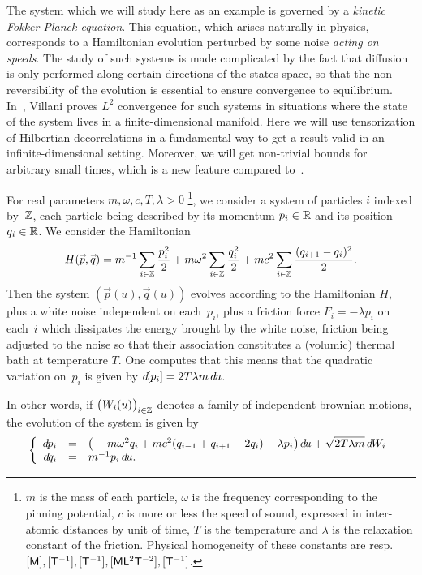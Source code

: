 The system which we will study here as an example
is governed by a \emph{kinetic Fokker-Planck equation}.
This equation, which arises naturally in phy\-sics, corresponds to a Hamiltonian evolution
perturbed by some noise \emph{acting on speeds}.
The study of such systems is made complicated by the fact that diffusion is only performed
along certain directions of the states space,
so that the non-reversibility of the evolution is essential to ensure convergence to equilibrium.
In~\cite{hypocoercivity}, Villani proves $L^2$ convergence for such systems
in situations where the state of the system lives in a finite-dimensional manifold.
Here we will use tensorization of Hilbertian decorrelations in a fundamental way
to get a result valid in an infinite-dimensional setting.
Moreover, we will get non-trivial bounds for arbitrary small times,
which is a new feature compared to~\cite{hypocoercivity}.

\begin{Def}\label{d7463}
For real parameters $m, \omega, c, T, \lambda > 0$%
\footnote{$m$ is the mass of each particle,
$\omega$ is the frequency corresponding to the pinning potential,
$c$ is more or less the speed of sound, expressed in inter-atomic distances by unit of time,
$T$ is the temperature and $\lambda$ is the relaxation constant of the friction.
Physical homogeneity of these constants are resp.~$[\mathsf{M}], \allowbreak 
[\mathsf{T}^{-1}], \allowbreak [\mathsf{T}^{-1}], \allowbreak [\mathsf{M}\mathsf{L}^2\mathsf{T}^{-2}], \allowbreak 
[\mathsf{T}^{-1}]$.},
we consider a system of particles $i$ indexed by~$\mathbb{Z}$,
each particle being described by its momentum $p_i \in \mathbb{R}$ and its position $q_i \in \mathbb{R}$.
We consider the Hamiltonian
\[ H(\vec{p},\vec{q}) = m^{-1} \sum_{i\in\ZZ} \frac{p_i^2}{2}
+ m\omega^2 \sum_{i\in\ZZ} \frac{q_i^2}{2}
+ mc^2 \sum_{i\in\ZZ} \frac{(q_{i+1}-q_i)^2}{2} .\]
Then the system $(\vec{p}(u),\vec{q}(u))$ evolves according to the Hamiltonian $H$,
plus a white noise independent on each~$p_i$, plus a friction force
$F_i = -\lambda p_i$ on each~$i$ which dissipates the energy brought by the white noise,
friction being adjusted to the noise so that their association constitutes
a (volumic) thermal bath at temperature $T$.
One computes that this means that the quadratic variation on~$p_i$ is given by
$\dx[p_i] = 2T\lambda m\,\dx{u}$.

In other words, if $\big(W_i(u)\big)_{i\in\ZZ}$ denotes a family of independent brownian motions,
the evolution of the system is given by
\[ \left\{ \begin{array}{rcl}
\dx{p_i} &=& \big( - m\omega^2 q_i + mc^2 (q_{i-1}+q_{i+1}-2q_i) - \lambda p_i \big) \,\dx{u}
+ \sqrt{2T\lambda m} \,\dx{W_i} \\
\dx{q_i} &=& m^{-1} p_i \,\dx{u} .
\end{array} \right. \]
\end{Def}

